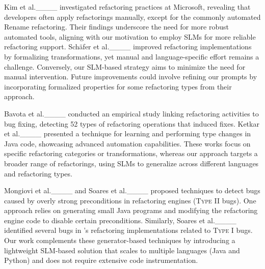 Kim et al.____ investigated refactoring practices at Microsoft, revealing that developers often apply refactorings manually, except for the commonly automated Rename refactoring. Their findings underscore the need for more robust automated tools, aligning with our motivation to employ SLMs for more reliable refactoring support. Sch\"afer et al.____ improved \eclipse{} refactoring implementations by formalizing transformations, yet manual and language-specific effort remains a challenge. 
Conversely, our SLM-based strategy aims to minimize the need for manual intervention. Future improvements could involve refining our prompts by incorporating formalized properties for some refactoring types from their approach.

Bavota et al.____ conducted an empirical study linking refactoring activities to bug fixing, detecting 52 types of refactoring operations that induced fixes. Ketkar et al.____ presented a technique for learning and performing type changes in Java code, showcasing advanced automation capabilities. 
These works focus on specific refactoring categories or transformations, whereas our approach targets a broader range of refactorings, using SLMs to generalize across different languages and refactoring types.

Mongiovi et al.____ and Soares et al.____ proposed techniques to detect bugs caused by overly strong preconditions in refactoring engines (\textsc{Type II} bugs). One approach relies on generating small Java programs and modifying the refactoring engine code to disable certain preconditions. Similarly, Soares et al.____ identified several bugs in \eclipse{}’s refactoring implementations related to \textsc{Type I} bugs. 
Our work complements these generator-based techniques by introducing a lightweight SLM-based solution that scales to multiple languages (Java and Python) and does not require extensive code instrumentation.

